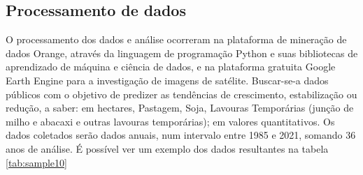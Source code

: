 \subsection{Processamento de dados}

O processamento dos dados e análise ocorreram na plataforma de mineração de dados Orange, através da linguagem de programação Python e suas bibliotecas de aprendizado de máquina e ciência de dados, e na plataforma gratuita Google Earth Engine para a investigação de imagens de satélite. Buscar-se-a dados públicos com o objetivo de predizer as tendências de crescimento, estabilização ou redução, a saber: em hectares,
Pastagem, Soja, Lavouras Temporárias (junção de milho e abacaxi e outras lavouras temporárias); em valores quantitativos. Os dados coletados serão dados anuais, num intervalo entre 1985 e 2021, somando 36 anos de análise. É possível ver um exemplo dos dados resultantes na tabela \ref{tab:sample10}

